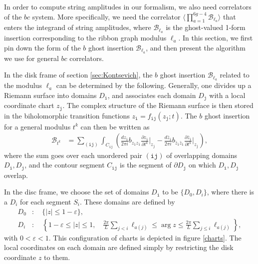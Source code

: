 \documentclass[12pt]{article}
\def\ie{\begin{equation}\begin{aligned}}
\def\fe{\end{aligned}\end{equation}}
\numberwithin{equation}{section}
\begin{document}
\label{bcsection}

In order to compute string amplitudes in our formalism, we also need correlators of the $bc$ system. More specifically, we need the correlator $\langle \prod_{a=1}^{6g-4}\mathcal{B}_{\ell_a}\rangle$ that enters the integrand of string amplitudes, where $\mathcal{B}_{\ell_a}$ is the ghost-valued 1-form insertion corresponding to the ribbon graph modulus $\ell_a$. In this section, we first pin down the form of the $b$ ghost insertion $\mathcal{B}_{\ell_a}$, and then present the algorithm we use for general $bc$ correlators.

In the disk frame of section \ref{sec:Kontsevich}, the $b$ ghost insertion $\mathcal{B}_{\ell_a}$ related to the modulus $\ell_a$ can be determined by the following. Generally, one divides up a Riemann surface into domains $D_\mathtt{i}$, and associates each domain $D_\mathtt{j}$ with a local coordinate chart $z_\mathtt{j}$. The complex structure of the Riemann surface is then stored in the biholomorphic transition functions $z_{\mathtt{i}} = f_{\mathtt{ij}}(z_\mathtt{j};t)$. The $b$ ghost insertion for a general modulus $t^k$ can then be written as
\ie \label{Binsert}
\mathcal{B}_{t^k}&= \sum_{(\mathtt{ij})}\int_{C_{\mathtt{ij}}}\left(\frac{dz_\mathtt{i}}{2\pi i}b_{z_\mathtt{i} z_\mathtt{i}}\frac{\partial z_\mathtt{i}}{\partial t^k}\bigg|_{z_\mathtt{j}}-\frac{d\bar{z}_{\mathtt{i}}}{2\pi i}b_{\bar{z}_\mathtt{i} \bar{z}_\mathtt{i}}\frac{\partial \bar{z}_\mathtt{i}}{\partial t^k}\bigg|_{z_\mathtt{j}}\right),
\fe
where the sum goes over each unordered pair $(\mathtt{ij})$ of overlapping domains $D_\mathtt{i}, D_\mathtt{j}$, and the contour segment $C_{\mathtt{ij}}$ is the segment of $\partial D_\mathtt{j}$ on which $D_\mathtt{i}, D_\mathtt{j}$ overlap. %


In the disc frame, we choose the set of domains $D_\mathtt{i}$ to be $\{D_0, D_i\}$, where there is a $D_i$ for each segment $S_i$. These domains are defined by
\ie
D_0&:\quad \{|z|\leq 1-\varepsilon\},\\
D_{i}&:\quad \left\{1-\varepsilon \leq |z|\leq 1,\quad \frac{2\pi}{L}\sum_{j< i}\ell_{a(j)}\leq \operatorname{arg} z \leq \frac{2\pi}{L}\sum_{j\leq i}\ell_{a(j)}\right\},
\fe
with $0<\varepsilon<1$. This configuration of charts is depicted in figure \ref{charts}. The local coordinates on each domain are defined simply by restricting the disk coordinate $z$ to them.
\end{document}

